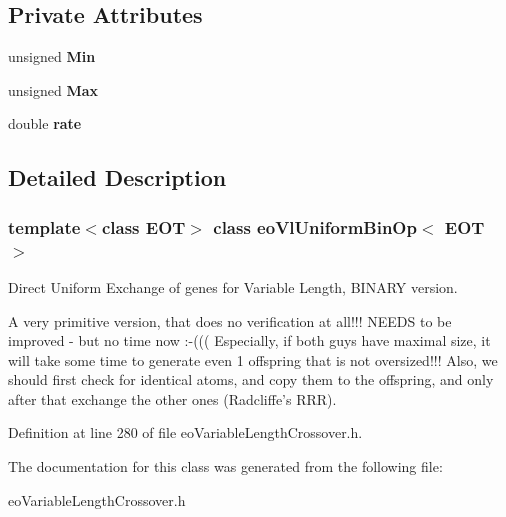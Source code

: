 \subsection*{Private Attributes}
\begin{CompactItemize}
\item 
unsigned {\bf Min}\label{classeo_vl_uniform_bin_op_r0}

\item 
unsigned {\bf Max}\label{classeo_vl_uniform_bin_op_r1}

\item 
double {\bf rate}\label{classeo_vl_uniform_bin_op_r2}

\end{CompactItemize}


\subsection{Detailed Description}
\subsubsection*{template$<$class EOT$>$ class eo\-Vl\-Uniform\-Bin\-Op$<$ EOT $>$}

Direct Uniform Exchange of genes for Variable Length, BINARY version. 

A very primitive version, that does no verification at all!!! NEEDS to be improved - but no time now :-((( Especially, if both guys have maximal size, it will take some time to generate even 1 offspring that is not oversized!!! Also, we should first check for identical atoms, and copy them to the offspring, and only after that exchange the other ones (Radcliffe's RRR). 



Definition at line 280 of file eo\-Variable\-Length\-Crossover.h.

The documentation for this class was generated from the following file:\begin{CompactItemize}
\item 
eo\-Variable\-Length\-Crossover.h\end{CompactItemize}
